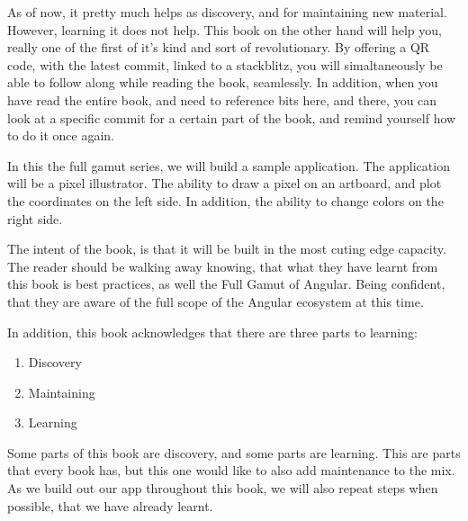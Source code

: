 As of now, it pretty much helps as discovery, and for maintaining new material.
However, learning it does not help. This book on the other hand will help you,
really one of the first of it's kind and sort of revolutionary. By offering a
QR code, with the latest commit, linked to a stackblitz, you will simaltaneously
be able to follow along while reading the book, seamlessly. In addition, when
you have read the entire book, and need to reference bits here, and there,
you can look at a specific commit for a certain part of the book, and remind
yourself how to do it once again.

In this the full gamut series, we will build a sample application. The
application will be a pixel illustrator. The ability to draw a pixel on an
artboard, and plot the coordinates on the left side. In addition, the ability to
change colors on the right side.

The intent of the book, is that it will be built in the most cuting edge
capacity. The reader should be walking away knowing, that what they have learnt
from this book is best practices, as well the Full Gamut of Angular. Being
confident, that they are aware of the full scope of the Angular ecosystem at
this time.

In addition, this book acknowledges that there are three parts to learning:
\begin{enumerate}
  \item Discovery
  \item Maintaining
  \item Learning
\end{enumerate}

Some parts of this book are discovery, and some parts are learning. This are
parts that every book has, but this one would like to also add maintenance to
the mix. As we build out our app throughout this book, we will also repeat steps
when possible, that we have already learnt.
